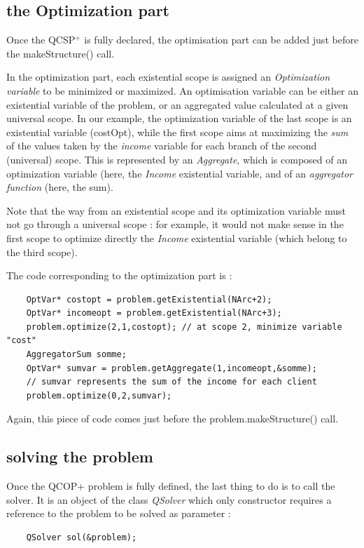 \documentclass{article}
\begin{document}
\subsection{the Optimization part}

Once the QCSP$^+$ is fully declared, the optimisation part can be added just before the makeStructure() call. 

In the optimization part, each existential scope is assigned an {\em Optimization variable} to be minimized or maximized. An optimisation variable can be either an existential variable of the problem, or an aggregated value calculated at a given universal scope. In our example, the optimization variable of the last scope is an existential variable (costOpt), while the first scope aims at maximizing the {\em sum} of the values taken by the {\em income} variable for each branch of the second (universal) scope. This is represented by an {\em Aggregate}, which is composed of an optimization variable (here, the {\em Income} existential variable, and of an {\em aggregator function} (here, the sum).

Note that the way from an existential scope and its optimization variable must not go through a universal scope : for example, it would not make sense in the first scope to optimize directly the {\em Income} existential variable (which belong to the third scope).

The code corresponding to the optimization part is : 
{\small
\begin{verbatim}
    OptVar* costopt = problem.getExistential(NArc+2); 
    OptVar* incomeopt = problem.getExistential(NArc+3);
    problem.optimize(2,1,costopt); // at scope 2, minimize variable "cost"
    AggregatorSum somme;
    OptVar* sumvar = problem.getAggregate(1,incomeopt,&somme);
    // sumvar represents the sum of the income for each client
    problem.optimize(0,2,sumvar);
\end{verbatim}
}

Again, this piece of code comes just before the problem.makeStructure() call.

\subsection{solving the problem}

Once the QCOP+ problem is fully defined, the last thing to do is to call the solver. It is an object of the class {\em QSolver} which only constructor requires a reference to the problem to be solved as parameter : 
{\small
\begin{verbatim}
    QSolver sol(&problem);
\end{verbatim}
}
\end{document}
